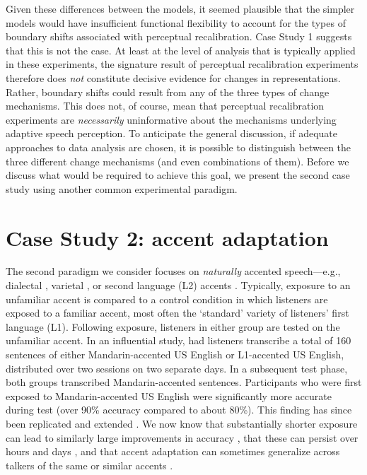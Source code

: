\documentclass[
  11pt,
  man,floatsintext]{apa6}
\begin{document}
Given these differences between the models, it seemed plausible that the simpler models would have insufficient functional flexibility to account for the types of boundary shifts associated with perceptual recalibration. Case Study 1 suggests that this is not the case. At least at the level of analysis that is typically applied in these experiments, the signature result of perceptual recalibration experiments therefore does \emph{not} constitute decisive evidence for changes in representations. Rather, boundary shifts could result from any of the three types of change mechanisms. This does not, of course, mean that perceptual recalibration experiments are \emph{necessarily} uninformative about the mechanisms underlying adaptive speech perception. To anticipate the general discussion, if adequate approaches to data analysis are chosen, it is possible to distinguish between the three different change mechanisms (and even combinations of them). Before we discuss what would be required to achieve this goal, we present the second case study using another common experimental paradigm.

\section{Case Study 2: accent adaptation}\label{sec:AA}

The second paradigm we consider focuses on \emph{naturally} accented speech---e.g., dialectal \autocite{smith2014}, varietal \autocite{shaw2018}, or second language (L2) accents \autocite{bradlow-bent2008,eisner2013,sidaras2009,weil2001a}. Typically, exposure to an unfamiliar accent is compared to a control condition in which listeners are exposed to a familiar accent, most often the `standard' variety of listeners' first language (L1). Following exposure, listeners in either group are tested on the unfamiliar accent. In an influential study, \textcite{bradlow-bent2008} had listeners transcribe a total of 160 sentences of either Mandarin-accented US English or L1-accented US English, distributed over two sessions on two separate days. In a subsequent test phase, both groups transcribed Mandarin-accented sentences. Participants who were first exposed to Mandarin-accented US English were significantly more accurate during test (over 90\% accuracy compared to about 80\%). This finding has since been replicated and extended \autocite[for review, see][]{baeseberk2020}. We now know that substantially shorter exposure can lead to similarly large improvements in accuracy \autocite[e.g., 80 sentences in a single session, about 2-5 minutes of speech,][]{xie2021jep}, that these can persist over hours and days \autocite{witteman2015,xie2018lcn}, and that accent adaptation can sometimes generalize across talkers of the same or similar accents \autocites[e.g.,][]{baeseberk2013,tzeng2016,xie2021jep}.
\end{document}
